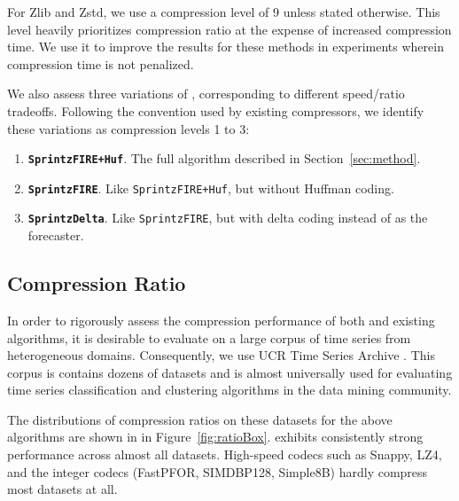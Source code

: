 For Zlib and Zstd, we use a compression level of 9 unless stated otherwise. This level heavily prioritizes compression ratio at the expense of increased compression time. We use it to improve the results for these methods in experiments wherein compression time is not penalized.

We also assess three variations of \mine, corresponding to different speed/ratio tradeoffs. Following the convention used by existing compressors, we identify these variations as compression levels 1 to 3:
\begin{enumerate}
\itemsep-1mm
    \item \textbf{\texttt{SprintzFIRE+Huf}}. The full algorithm described in Section~\ref{sec:method}.
    \item \textbf{\texttt{SprintzFIRE}}. Like \texttt{SprintzFIRE+Huf}, but without Huffman coding.
    \item \textbf{\texttt{SprintzDelta}}. Like \texttt{SprintzFIRE}, but with delta coding instead of \fire as the forecaster.
\end{enumerate}



\subsection{Compression Ratio}

In order to rigorously assess the compression performance of both \minesp and existing algorithms, it is desirable to evaluate on a large corpus of time series from heterogeneous domains. Consequently, we use UCR Time Series Archive \cite{ucrTimeSeries}. This corpus is contains dozens of datasets and is almost universally used for evaluating time series classification and clustering algorithms in the data mining community.

The distributions of compression ratios on these datasets for the above algorithms are shown in in Figure~\ref{fig:ratioBox}. \mine \text{} exhibits consistently strong performance across almost all datasets. High-speed codecs such as Snappy, LZ4, and the integer codecs (FastPFOR, SIMDBP128, Simple8B) hardly compress most datasets at all.


